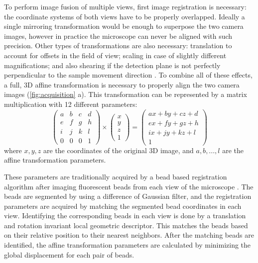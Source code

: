 To perform image fusion of multiple views, first image registration is necessary: the coordinate systems of both views have to be properly overlapped. Ideally a single mirroring transformation would be enough to superpose the two camera images, however in practice the microscope can never be aligned with such precision. Other types of transformations are also necessary: translation to account for offsets in the field of view; scaling in case of slightly different magnifications; and also shearing if the detection plane is not perfectly perpendicular to the sample movement direction \cite{krzic_multiple-view_2009}. To combine all of these effects, a full, 3D affine transformation is necessary to properly align the two camera images (\autoref{fig:acquisition} a). This transformation can be represented by a matrix multiplication with 12 different parameters:
\[
\begin{pmatrix}
a & b & c & d \\ 
e & f & g & h \\ 
i & j & k & l \\
0 & 0 & 0 & 1 
\end{pmatrix}
\times
\begin{pmatrix}
x\\
y\\
z\\
1
\end{pmatrix}
=
\begin{pmatrix}
a x + b y + c z + d\\ 
e x + f y + g z + h\\ 
i x + j y + k z + l\\
1
\end{pmatrix}
\]
where $x, y, z$ are the coordinates of the original 3D image, and $a, b, ..., l$ are the affine transformation parameters.

These parameters are traditionally acquired by a bead based registration algorithm after imaging fluorescent beads from each view of the microscope \cite{preibisch_bead-based_2009,preibisch_software_2010}. The beads are segmented by using a difference of Gaussian filter, and the registration parameters are acquired by matching the segmented bead coordinates in each view. Identifying the corresponding beads in each view is done by a translation and rotation invariant local geometric descriptor. This matches the beads based on their relative position to their nearest neighbors. After the matching beads are identified, the affine transformation parameters are calculated by minimizing the global displacement for each pair of beads.


